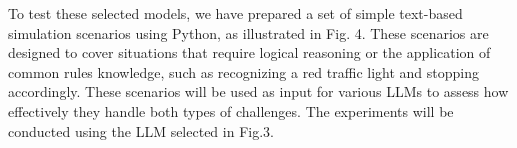 \documentclass[conference]{IEEEtran}
\begin{document}


To test these selected models, we have prepared a set of simple text-based simulation scenarios using Python, as illustrated in Fig. 4. These scenarios are designed to cover situations that require logical reasoning or the application of common rules knowledge, such as recognizing a red traffic light and stopping accordingly. These scenarios will be used as input for various LLMs to assess how effectively they handle both types of challenges. The experiments will be conducted using the LLM selected in Fig.3. 







\end{document}
